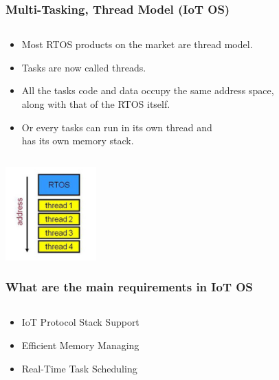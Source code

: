 \documentclass{beamer}
\begin{document}
\begin{frame}
	\frametitle{Multi-Tasking, Thread Model (IoT OS)}
	\begin{columns}[c]
		\begin{column}{30cm}
			\vspace{.1cm}
			\begin{itemize}
				\justifying
				\item Most RTOS products on the market are thread model.
				\item \textcolor{TextGreen}{Tasks} are now called \textcolor{TextGreen}{threads}.
				\item All the \textcolor{TextOrange}{tasks} code and data occupy
				\textcolor{Ocean}{the same address space},\\
				along with that of the RTOS itself.
				\item Or every \textcolor{TextOrange}{tasks} can run in its own thread and \\
				\textcolor{Ocean}{has its own memory stack}.
			\end{itemize}
		\end{column}
	\end{columns}
	\vspace{.5cm}
	\hspace*{5.5cm} \includegraphics[width=3.5cm]{figs/thread-model.jpg}
\end{frame}

\begin{frame}
	\frametitle{What are the main requirements in IoT OS}
	\begin{columns}[c]
		\begin{column}{30cm}
			\vspace{.1cm}
			\begin{itemize}
				\justifying
				\item IoT Protocol Stack Support
				\item Efficient Memory Managing
				\item Real-Time Task Scheduling
			\end{itemize}
		\end{column}
	\end{columns}
\end{frame}
\end{document}
